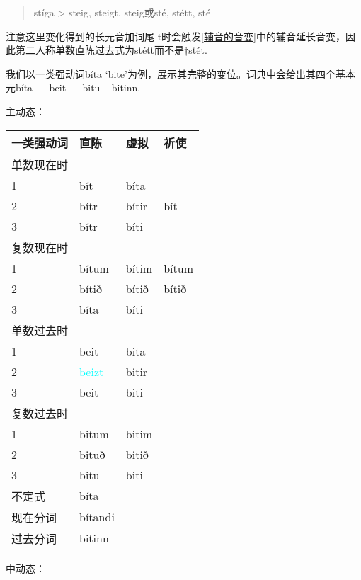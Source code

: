 \begin{quote}
    stíga > steig, steigt, steig或sté, stétt, sté
\end{quote}

注意这里变化得到的长元音加词尾-t时会触发\ref{辅音的音变}中的辅音延长音变，因此第二人称单数直陈过去式为stétt而不是†stét.

我们以一类强动词bíta
`bite'为例，展示其完整的变位。词典中会给出其四个基本元bíta --- beit
--- bitu -- bitinn.

主动态：

\begin{longtable}{llll}
    \toprule
    一类强动词 & 直陈    & 虚拟  & 祈使  \\
    \midrule
    \endhead
    \bottomrule
    \endfoot
    单数现在时 &         &       &       \\
    1          & bít     & bíta  &       \\
    2          & bítr    & bítir & bít   \\
    3          & bítr    & bíti  &       \\
    复数现在时 &         &       &       \\
    1          & bítum   & bítim & bítum \\
    2          & bítið   & bítið & bítið \\
    3          & bíta    & bíti  &       \\
    单数过去时 &         &       &       \\
    1          & beit    & bita  &       \\
    2          & \textcolor{cyan}{beizt}   & bitir &       \\
    3          & beit    & biti  &       \\
    复数过去时 &         &       &       \\
    1          & bitum   & bitim &       \\
    2          & bituð   & bitið &       \\
    3          & bitu    & biti  &       \\
    不定式     & bíta    &       &       \\
    现在分词   & bítandi &       &       \\
    过去分词   & bitinn  &       &       \\
\end{longtable}

中动态：

